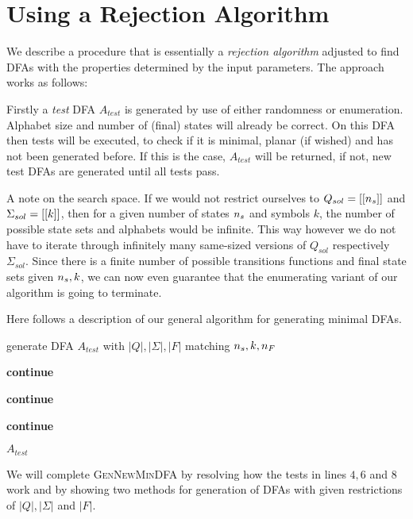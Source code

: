 \section{Using a Rejection Algorithm}

We describe a procedure that is essentially a \emph{rejection algorithm} adjusted to find DFAs with the properties determined by the input parameters. The approach works as follows:

Firstly a \emph{test} DFA $A_{test}$ is generated by use of either randomness or enumeration. Alphabet size and number of (final) states will already be correct. On this DFA then tests will be executed, to check if it is minimal, planar (if wished) and has not been generated before. If this is the case, $A_{test}$ will be returned, if not, new test DFAs are generated until all tests pass.

A note on the search space. If we would not restrict ourselves to $Q_{sol} = [[{n_s}]]$ and $\Sigma_{sol} = [[k]]$, then for a given number of states ${n_s}$ and symbols $k$, the number of possible state sets and alphabets would be infinite. This way however we do not have to iterate through infinitely many same-sized versions of $Q_{sol}$ respectively $\Sigma_{sol}$. Since there is a finite number of possible transitions functions and final state sets given ${n_s}, k$, we can now even guarantee that the enumerating variant of our algorithm is going to terminate.

Here follows a description of our general algorithm for generating minimal DFAs.
\vspace{0.2cm}
\begin{algorithmic}[1]
		
			\vspace{0.2cm}
		
			\State generate DFA $A_{test}$ with $|Q|, |\Sigma|, |F|$ matching ${n_s}, k, {n_F}$
			
			\vspace{0.2cm}
			
				\State \textbf{continue}
			\EndIf
			
				\State \textbf{continue}
			\EndIf
			
				\State \textbf{continue}
			\EndIf
			
			\vspace{0.2cm}
			
			\State\Return $A_{test}$
		\EndWhile
	\EndFunction
\end{algorithmic}
\vspace{0.2cm}
We will complete \textsc{GenNewMinDFA} by resolving how the tests in lines $4, 6$ and $8$ work and by showing two methods for generation of DFAs with given restrictions of $|Q|, |\Sigma|$ and $|F|$.

